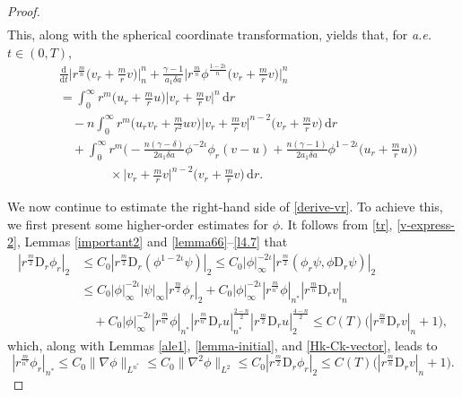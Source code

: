 \documentclass[11pt,reqno]{amsart}
\numberwithin{rk}{section}
\numberwithin{prop}{section}
\numberwithin{mydef}{section}
\numberwithin{lem}{section}
\numberwithin{equation}{section}
\numberwithin{thm}{section}
\begin{document}
\begin{proof}
\begin{equation}
\begin{aligned}
\end{aligned}
\end{equation}
This, along with the spherical coordinate transformation, yields that, 
for {\it a.e.} $t\in (0,T)$,
\begin{equation}\label{derive-vr}
\begin{aligned}
&\frac{\mathrm{d}}{\mathrm{d}t}\Big|r^{\frac{m}{n}}\big(v_r+\frac{m}{r}v\big)\Big|_{n}^{n}+\frac{\gamma-1}{a_1\delta a}\Big|r^\frac{m}{n}\phi^\frac{1-2\iota}{n}\big(v_r+\frac{m}{r}v\big)\Big|_{n}^{n}\\
&=\int_0^\infty r^m \big(u_r+\frac{m}{r}u\big)\Big|v_r+\frac{m}{r}v\Big|^n\,\mathrm{d}r\\
&\quad -n\int_0^\infty r^m \Big(u_rv_r+\frac{m}{r^2}uv\Big)\Big|v_r+\frac{m}{r}v\Big|^{n-2}\big(v_r+\frac{m}{r}v\big)\,\mathrm{d}r\\
&\quad +  \int_0^\infty r^m\Big(-\frac{n(\gamma-\delta)}{2a_1\delta a}\phi^{-2\iota}\phi_r(v-u)+\frac{n(\gamma-1)}{2a_1\delta a}\phi^{1-2\iota}\big(u_r+\frac{m}{r}u\big)\Big)\\
&\qquad\qquad \times \Big|v_r+\frac{m}{r}v\Big|^{n-2}\big(v_r+\frac{m}{r}v\big)\,\mathrm{d}r.
\end{aligned}    
\end{equation}



We now continue to estimate the right-hand side of \eqref{derive-vr}. To achieve this, we first present some higher-order estimates for $\phi$. It follows from \eqref{tr}, \eqref{v-express-2},  Lemmas \ref{important2} and \ref{lemma66}--\ref{l4.7} that
\begin{equation}\label{dier}
\begin{aligned}
|r^\frac{m}{2}\mathrm{D}_r \phi_r|_2&\leq C_0 |r^\frac{m}{2}\mathrm{D}_r (\phi^{1-2\iota}\psi)|_2\leq C_0|\phi|_\infty^{-2\iota} |r^\frac{m}{2} (\phi_r\psi,\phi\mathrm{D}_r \psi)|_2\\
&\leq C_0|\phi|_\infty^{-2\iota} |\psi|_\infty|r^\frac{m}{2}\phi_r|_2+  C_0|\phi|_\infty^{-2\iota}|r^\frac{m}{n^*}\phi|_{n^*} |r^\frac{m}{n} \mathrm{D}_rv|_n\\
&\quad + C_0|\phi|_\infty^{-2\iota}|r^\frac{m}{n^*}\phi|_{n^*}|r^\frac{m}{n^*} \mathrm{D}_ru|_{n^*}^\frac{2-n}{2}|r^\frac{m}{2} \mathrm{D}_ru|_2^\frac{4-n}{2} \leq C(T)\big(|r^\frac{m}{n}\mathrm{D}_r v|_n+1\big), 
\end{aligned}
\end{equation}
which, along with Lemmas \ref{ale1}, \ref{lemma-initial}, and \ref{Hk-Ck-vector}, leads to
\begin{equation}\label{dier2}
|r^\frac{m}{n^*} \phi_r|_{n^*}\leq C_0 \|\nabla\phi\|_{L^{n^*}} \leq C_0 \|\nabla^2\phi\|_{L^{2}}\leq C_0|r^\frac{m}{2}\mathrm{D}_r \phi_r|_2 \leq C(T)\big(|r^\frac{m}{n}\mathrm{D}_r v|_n+1\big). 
\end{equation}



\end{proof}
\end{document}
